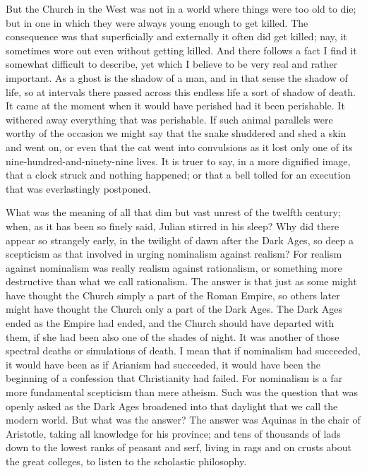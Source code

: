 But the Church in the West was not in a world where things were too old to die; but in one in which they were always young enough to get killed. The consequence was that superficially and externally it often did get killed; nay, it sometimes wore out even without getting killed. And there follows a fact I find it somewhat difficult to describe, yet which I believe to be very real and rather important. As a ghost is the shadow of a man, and in that sense the shadow of life, so at intervals there passed across this endless life a sort of shadow of death. It came at the moment when it would have perished had it been perishable. It withered away everything that was perishable. If such animal parallels were worthy of the occasion we might say that the snake shuddered and shed a skin and went on, or even that the cat went into convulsions as it lost only one of its nine-hundred-and-ninety-nine lives. It is truer to say, in a more dignified image, that a clock struck and nothing happened; or that a bell tolled for an execution that was everlastingly postponed.

What was the meaning of all that dim but vast unrest of the twelfth century; when, as it has been so finely said, Julian stirred in his sleep? Why did there appear so strangely early, in the twilight of dawn after the Dark Ages, so deep a scepticism as that involved in urging nominalism against realism? For realism against nominalism was really realism against rationalism, or something more destructive than what we call rationalism. The answer is that just as some might have thought the Church simply a part of the Roman Empire, so others later might have thought the Church only a part of the Dark Ages. The Dark Ages ended as the Empire had ended, and the Church should have departed with them, if she had been also one of the shades of night. It was another of those spectral deaths or simulations of death. I mean that if nominalism had succeeded, it would have been as if Arianism had succeeded, it would have been the beginning of a confession that Christianity had failed. For nominalism is a far more fundamental scepticism than mere atheism. Such was the question that was openly asked as the Dark Ages broadened into that daylight that we call the modern world. But what was the answer? The answer was Aquinas in the chair of Aristotle, taking all knowledge for his province; and tens of thousands of lads down to the lowest ranks of peasant and serf, living in rags and on crusts about the great colleges, to listen to the scholastic philosophy.

